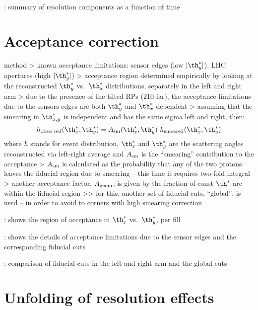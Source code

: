 \> : summary of resolution components as a function of time


\section{Acceptance correction}

\> method
\>> known acceptance limitations: sensor edges (low $|\th_y^*|$), LHC apertures (high $|\th_y^*|$)
\>> acceptance region determined empirically by looking at the reconstructed $\th_y^*$ vs.~$\th_x^*$ distributions, separately in the left and right arm
\>> due to the presence of the tilted RPs (210-far), the acceptance limitations due to the sensors edges are both $\th_y^*$ and $\th_x^*$ dependent
\>> assuming that the smearing in $\th_{x, y}^*$ is independent and has the same sigma left and right, then:
$$h_{\rm observed}(\th_x^*, \th_y^*) = A_{\rm sm}(\th_x^*, \th_y^*)\ h_{\rm smeared}(\th_x^*, \th_y^*)$$
where $h$ stands for event distribution, $\th_x^*$ and $\th_y^*$ are the scattering angles reconstructed via left-right average and $A_{\rm sm}$ is the ``smearing'' contribution to the acceptance
\>> $A_{\rm sm}$ is calculated as the probability that any of the two protons leaves the fiducial region due to smearing -- this time it requires two-fold integral
\>> another acceptance factor, $A_{\rm geom}$, is given by the fraction of const-$\th^*$ arc within the fiducial region
\>>> for this, another set of fiducial cuts, ``global'', is used -- in order to avoid to corners with high smearing correction

\> : shows the region of acceptance in $\th_x^*$ vs.~$\th_y^*$, per fill

\> : shows the details of acceptance limitations due to the sensor edges and the corresponding fiducial cuts

\> : comparison of fiducial cuts in the left and right arm and the global cuts





\section{Unfolding of resolution effects}

